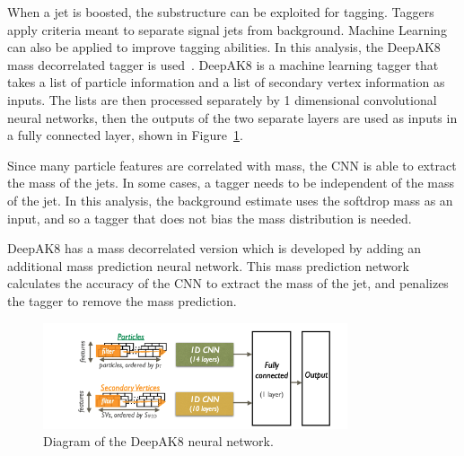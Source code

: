 When a jet is boosted, the substructure can be exploited for tagging. Taggers apply criteria meant to separate signal jets from background. Machine Learning can also be applied to improve tagging abilities. In this analysis, the DeepAK8 mass decorrelated tagger is used~\cite{CMS:2020poo}. DeepAK8 is a machine learning tagger that takes a list of particle information and a list of secondary vertex information as inputs. The lists are then processed separately by 1 dimensional convolutional neural networks, then the outputs of the two separate layers are used as inputs in a fully connected layer, shown in Figure~\ref{fig:deepak8}.

Since many particle features are correlated with mass, the CNN is able to extract the mass of the jets. In some cases, a tagger needs to be independent of the mass of the jet. In this analysis, the background estimate uses the softdrop mass as an input, and so a tagger that does not bias the mass distribution is needed.

DeepAK8 has a mass decorrelated version which is developed by adding an additional mass prediction neural network. This mass prediction network calculates the accuracy of the CNN to extract the mass of the jet, and penalizes the tagger to remove the mass prediction.


\begin{figure}[h]
\centering
	\includegraphics[width=0.8\textwidth]{figures/deepak8.png}
	\caption{Diagram of the DeepAK8 neural network.}
	\label{fig:deepak8}
\end{figure}


